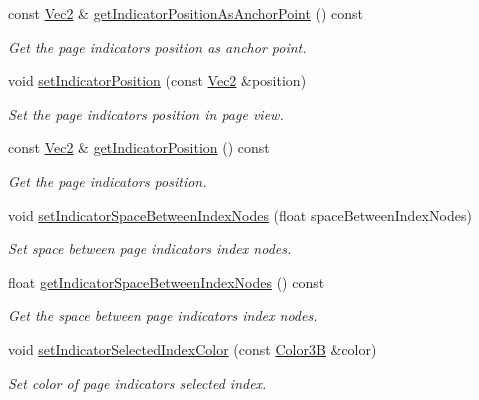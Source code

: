 \begin{DoxyCompactItemize}
const \hyperlink{classVec2}{Vec2} \& \hyperlink{classui_1_1PageView_a285dea7517bb2bd0e4bb0ba7f02c1922}{get\+Indicator\+Position\+As\+Anchor\+Point} () const
\begin{DoxyCompactList}\small\item\em Get the page indicator\textquotesingle{}s position as anchor point. \end{DoxyCompactList}\item 
void \hyperlink{classui_1_1PageView_abcc7b971a29ec68732a8e30a293b8018}{set\+Indicator\+Position} (const \hyperlink{classVec2}{Vec2} \&position)
\begin{DoxyCompactList}\small\item\em Set the page indicator\textquotesingle{}s position in page view. \end{DoxyCompactList}\item 
const \hyperlink{classVec2}{Vec2} \& \hyperlink{classui_1_1PageView_a0b8e1469c924aa6c7980790f786eae60}{get\+Indicator\+Position} () const
\begin{DoxyCompactList}\small\item\em Get the page indicator\textquotesingle{}s position. \end{DoxyCompactList}\item 
void \hyperlink{classui_1_1PageView_ac181b03f26045ac2b0be91ed177d03db}{set\+Indicator\+Space\+Between\+Index\+Nodes} (float space\+Between\+Index\+Nodes)
\begin{DoxyCompactList}\small\item\em Set space between page indicator\textquotesingle{}s index nodes. \end{DoxyCompactList}\item 
float \hyperlink{classui_1_1PageView_a5ed4633cd13e1d9be2d195de1e1be077}{get\+Indicator\+Space\+Between\+Index\+Nodes} () const
\begin{DoxyCompactList}\small\item\em Get the space between page indicator\textquotesingle{}s index nodes. \end{DoxyCompactList}\item 
void \hyperlink{classui_1_1PageView_a685219b0641c33d694fa5e89fd7f0e76}{set\+Indicator\+Selected\+Index\+Color} (const \hyperlink{structColor3B}{Color3B} \&color)
\begin{DoxyCompactList}\small\item\em Set color of page indicator\textquotesingle{}s selected index. \end{DoxyCompactList}\item 

\end{DoxyCompactItemize}
